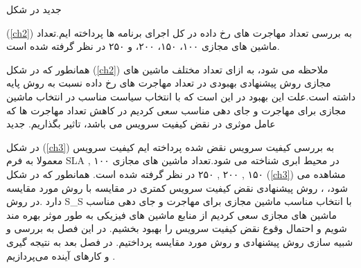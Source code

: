 ‌جدید 
در شکل
	
(\ref{ch2})
به بررسی تعداد مهاجرت های رخ داده در کل اجرای برنامه ها  پرداخته ایم.تعداد ماشین های مجازی ۱۰۰، ۱۵۰، ۲۰۰، و ۲۵۰ در نظر گرفته شده است. 

همانطور که در شکل 
(\ref{ch2})
 ملاحظه می شود، به ازای تعداد مختلف ماشین های مجازی روش پیشنهادی بهبودی در تعداد مهاجرت های رخ داده نسبت به روش پایه داشته است.علت این بهبود در این است که با انتخاب سیاست مناسب در انتخاب ماشین مجازی برای مهاجرت و جای دهی مناسب سعی کردیم در کاهش تعداد مهاجرت ها که عامل موثری در نقض کیفیت سرویس می باشد، تاثیر بگذاریم.
‌جدید

 در شکل
(\ref{ch3})
 به بررسی کیفیت سرویس نقض شده پرداخته ایم کیفیت سرویس معمولا به فرم  SLA در محیط ابری شناخته می شود.تعداد ماشین های مجازی
۱۰۰
,
۱۵۰
,
۲۰۰
,
۲۵۰
  در نظر گرفته شده است.
همانطور که در شکل  
(\ref{ch3})
مشاهده می شود، ­، روش پیشنهادی نقض کیفیت سرویس کمتری در مقایسه با روش مورد مقایسه دارد .در روش S\_S با انتخاب مناسب ماشین مجازی برای مهاجرت و جای دهی مناسب ماشین های مجازی سعی کردیم از منابع ماشین های فیزیکی به طور موثر بهره مند شویم و احتمال وقوع نقض کیفیت سرویس  را بهبود بخشیم. 
در این فصل به بررسی و شبیه سازی روش پیشنهادی  و روش مورد مقایسه پرداختیم. در فصل بعد به نتیجه گیری  و کارهای آینده می‌پردازیم .
